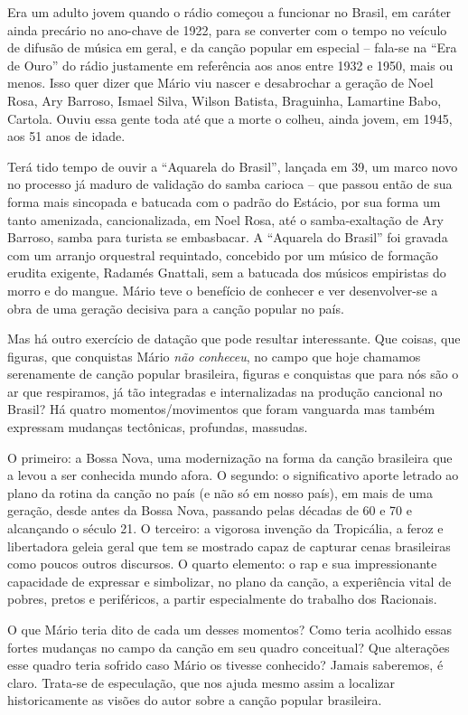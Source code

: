 Era um adulto jovem quando o rádio começou a funcionar no Brasil, em
caráter ainda precário no ano-chave de 1922, para se converter com o
tempo no veículo de difusão de música em geral, e da canção popular em
especial -- fala-se na ``Era de Ouro'' do rádio justamente em referência
aos anos entre 1932 e 1950, mais ou menos. Isso quer dizer que Mário viu
nascer e desabrochar a geração de Noel Rosa, Ary Barroso, Ismael Silva,
Wilson Batista, Braguinha, Lamartine Babo, Cartola. Ouviu essa gente
toda até que a morte o colheu, ainda jovem, em 1945, aos 51 anos de
idade.

Terá tido tempo de ouvir a ``Aquarela do Brasil'', lançada em 39, um
marco novo no processo já maduro de validação do samba carioca -- que
passou então de sua forma mais sincopada e batucada com o padrão do
Estácio, por sua forma um tanto amenizada, cancionalizada, em Noel Rosa,
até o samba-exaltação de Ary Barroso, samba para turista se embasbacar.
A ``Aquarela do Brasil'' foi gravada com um arranjo orquestral
requintado, concebido por um músico de formação erudita exigente,
Radamés Gnattali, sem a batucada dos músicos empiristas do morro e do
mangue. Mário teve o benefício de conhecer e ver desenvolver-se a obra
de uma geração decisiva para a canção popular no país.

Mas há outro exercício de datação que pode resultar interessante. Que
coisas, que figuras, que conquistas Mário \emph{não conheceu}, no campo
que hoje chamamos serenamente de canção popular brasileira, figuras e
conquistas que para nós são o ar que respiramos, já tão integradas e
internalizadas na produção cancional no Brasil? Há quatro
momentos/movimentos que foram vanguarda mas também expressam mudanças
tectônicas, profundas, massudas.

O primeiro: a Bossa Nova, uma modernização na forma da canção brasileira
que a levou a ser conhecida mundo afora. O segundo: o significativo
aporte letrado ao plano da rotina da canção no país (e não só em nosso
país), em mais de uma geração, desde antes da Bossa Nova, passando pelas
décadas de 60 e 70 e alcançando o século 21. O terceiro: a vigorosa
invenção da Tropicália, a feroz e libertadora geleia geral que tem se
mostrado capaz de capturar cenas brasileiras como poucos outros
discursos. O quarto elemento: o rap e sua impressionante capacidade de
expressar e simbolizar, no plano da canção, a experiência vital de
pobres, pretos e periféricos, a partir especialmente do trabalho dos
Racionais.

O que Mário teria dito de cada um desses momentos? Como teria acolhido
essas fortes mudanças no campo da canção em seu quadro conceitual? Que
alterações esse quadro teria sofrido caso Mário os tivesse conhecido?
Jamais saberemos, é claro. Trata-se de especulação, que nos ajuda mesmo
assim a localizar historicamente as visões do autor sobre a canção
popular brasileira.

